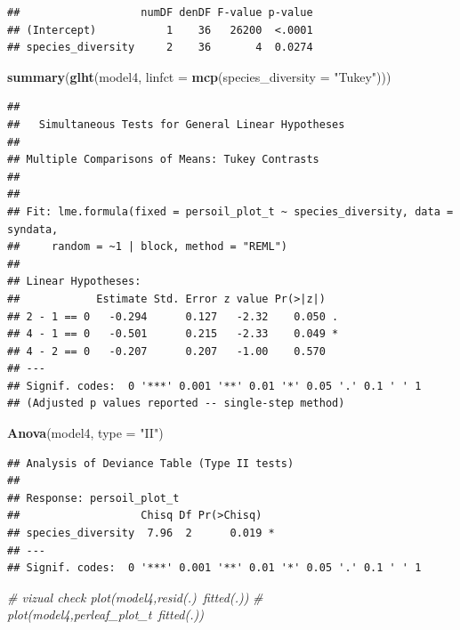 \documentclass[]{article}
\newenvironment{Shaded}{}{}
\newcommand{\KeywordTok}[1]{\textcolor[rgb]{0.00,0.44,0.13}{\textbf{{#1}}}}
\newcommand{\DataTypeTok}[1]{\textcolor[rgb]{0.56,0.13,0.00}{{#1}}}
\newcommand{\StringTok}[1]{\textcolor[rgb]{0.25,0.44,0.63}{{#1}}}
\newcommand{\CommentTok}[1]{\textcolor[rgb]{0.38,0.63,0.69}{\textit{{#1}}}}
\newcommand{\NormalTok}[1]{{#1}}
\begin{document}
\begin{verbatim}
##                   numDF denDF F-value p-value
## (Intercept)           1    36   26200  <.0001
## species_diversity     2    36       4  0.0274
\end{verbatim}

\begin{Shaded}
\begin{Highlighting}[]
\KeywordTok{summary}\NormalTok{(}\KeywordTok{glht}\NormalTok{(model4, }\DataTypeTok{linfct =} \KeywordTok{mcp}\NormalTok{(}\DataTypeTok{species_diversity =} \StringTok{"Tukey"}\NormalTok{)))}
\end{Highlighting}
\end{Shaded}

\begin{verbatim}
## 
##   Simultaneous Tests for General Linear Hypotheses
## 
## Multiple Comparisons of Means: Tukey Contrasts
## 
## 
## Fit: lme.formula(fixed = persoil_plot_t ~ species_diversity, data = syndata, 
##     random = ~1 | block, method = "REML")
## 
## Linear Hypotheses:
##            Estimate Std. Error z value Pr(>|z|)  
## 2 - 1 == 0   -0.294      0.127   -2.32    0.050 .
## 4 - 1 == 0   -0.501      0.215   -2.33    0.049 *
## 4 - 2 == 0   -0.207      0.207   -1.00    0.570  
## ---
## Signif. codes:  0 '***' 0.001 '**' 0.01 '*' 0.05 '.' 0.1 ' ' 1
## (Adjusted p values reported -- single-step method)
\end{verbatim}

\begin{Shaded}
\begin{Highlighting}[]
\KeywordTok{Anova}\NormalTok{(model4, }\DataTypeTok{type =} \StringTok{"II"}\NormalTok{)}
\end{Highlighting}
\end{Shaded}

\begin{verbatim}
## Analysis of Deviance Table (Type II tests)
## 
## Response: persoil_plot_t
##                   Chisq Df Pr(>Chisq)  
## species_diversity  7.96  2      0.019 *
## ---
## Signif. codes:  0 '***' 0.001 '**' 0.01 '*' 0.05 '.' 0.1 ' ' 1
\end{verbatim}

\begin{Shaded}
\begin{Highlighting}[]

\CommentTok{# vizual check plot(model4,resid(.)~fitted(.))}
\CommentTok{# plot(model4,perleaf_plot_t~fitted(.))}
\end{Highlighting}
\end{Shaded}
\end{document}
